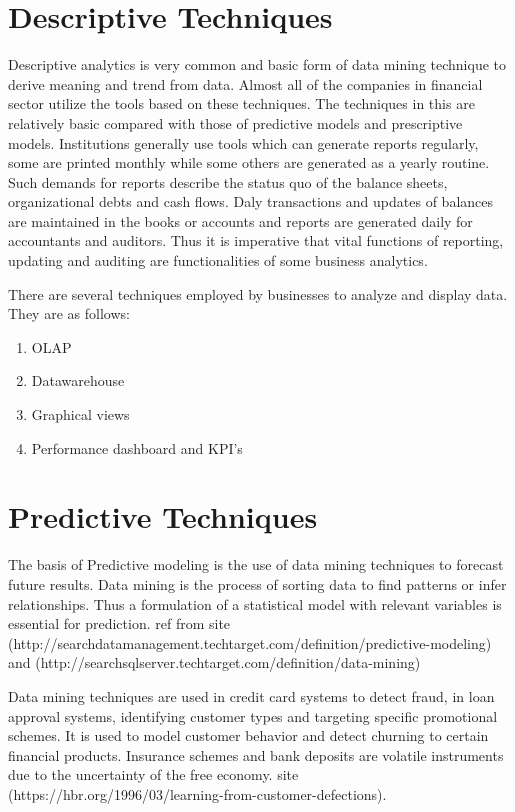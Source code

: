 \setlength{\footskip}{8mm}

\chapter{Descriptive Techniques} 
\label{ch:literature-review}
Descriptive analytics is very common and basic form of data mining technique to derive meaning and trend from data. Almost all of the companies in financial sector utilize the tools based on these techniques. The techniques in this are relatively basic compared with those of predictive models and prescriptive models. Institutions generally use tools which can generate reports regularly, some are printed monthly while some others are generated  as a yearly routine. Such demands for reports describe the status quo of the balance sheets, organizational debts and cash flows. Daly transactions and updates of balances are maintained in the books or accounts and reports are generated daily for accountants and auditors. Thus it is imperative that vital functions of reporting, updating and auditing are functionalities of some business analytics.

There are several techniques employed by businesses to analyze and display data. They are as follows:
\begin{enumerate}
	\item OLAP
	\item Datawarehouse
	\item Graphical views
	\item Performance dashboard and KPI's
\end{enumerate}

\FloatBarrier


%
%
%
%

\setlength{\footskip}{8mm}

\chapter{Predictive Techniques} 
\label{predictive-techniques}
The basis of Predictive modeling is the use of data mining techniques to forecast future results. Data mining is the process of sorting data to find patterns or infer relationships.
Thus a formulation of a statistical model with relevant variables is essential for prediction. 
ref from site (http://searchdatamanagement.techtarget.com/definition/predictive-modeling) and (http://searchsqlserver.techtarget.com/definition/data-mining)

Data mining techniques are used in credit card systems to detect fraud, in loan approval systems, identifying customer types and targeting specific promotional schemes. It is used to model customer behavior and detect churning to certain financial products. Insurance schemes and bank deposits are volatile instruments due to the uncertainty of the free economy. site (https://hbr.org/1996/03/learning-from-customer-defections).


